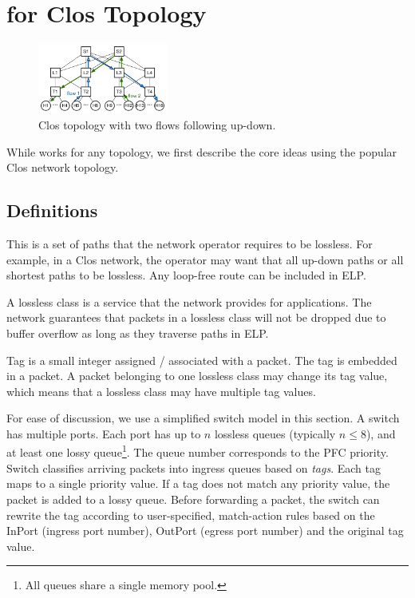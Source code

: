 \section{\sysname{} for Clos Topology}
\label{sec:specific}

\begin{figure}[t]
		\centering
		\includegraphics[width=0.38\textwidth] {figs/updown_paths}
		\vspace{-1em}
		\caption{Clos topology with two flows following up-down.}
		\vspace{-2em}
		\label{fig:basic_clos}
\end{figure}

While \sysname{} works for any topology, we first describe the core ideas using
the popular Clos network topology.

\subsection {Definitions}

 This is a set of paths that the network
operator requires to be lossless. For example, in a Clos network, the operator
may want that all up-down paths or all shortest paths to be lossless.  Any
loop-free route can be included in ELP.

 A lossless class is a service that the network provides for
applications. The network guarantees that packets in a lossless class will not
be dropped due to buffer overflow as long as they traverse paths in ELP.

 Tag is a small integer assigned / associated with a packet. The tag
is embedded in a packet. A packet belonging to one lossless class may change its
tag value, which means that a lossless class may have multiple tag values.

 For ease of discussion, we use a simplified
switch model in this section.  A switch has multiple ports. Each port
has up to $n$ lossless queues (typically $n\leq8$), and at least one
lossy queue\footnote{All queues share a single memory pool.}. The queue
number corresponds to the PFC priority. Switch classifies arriving
packets into ingress queues based on {\em tags}. Each tag maps to a
single priority value. If a tag does not match any priority value, the
packet is added to a lossy queue. Before forwarding a packet, the
switch can rewrite the tag according to user-specified, match-action
rules based on the InPort (ingress port number), OutPort (egress port number)
and the original tag value.

